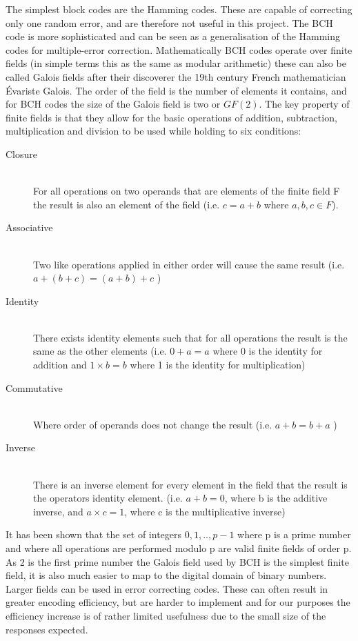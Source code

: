 The simplest block codes are the Hamming codes.
These are capable of correcting only one random error, and are therefore not
useful in this project.
The BCH code is more sophisticated and can be seen as a generalisation of the
Hamming codes for multiple-error correction.
Mathematically BCH codes operate over finite fields (in simple terms this as the
same as modular arithmetic) these can also be called Galois fields after their
discoverer the 19th century French mathematician \'{E}variste Galois.
The order of the field is the number of elements it contains, and for BCH codes
the size of the Galois field is two or $GF(2)$. The key property of finite
fields is that they allow for the basic operations of addition, subtraction,
multiplication and division to be used while holding to six conditions:

\begin{description}
\item[Closure] \hfill \\
For all operations on two operands that are elements of the finite field F the
result is also an element of the field (i.e.  $c=a+b$ where $a,b,c \in F$).
\item[Associative] \hfill \\
Two like operations applied in either order will cause the same result
(i.e.  $a+(b+c)=(a+b)+c$ )
\item[Identity] \hfill \\
There exists identity elements such that for all operations the result is the
same as the other elements (i.e. $0 + a = a$ where 0 is the identity for addition
and $1 \times b = b$ where 1 is the identity for multiplication)
\item[Commutative] \hfill \\
Where order of operands does not change the result (i.e. $a + b = b + a$ )
\item[Inverse] \hfill \\
There is an inverse element for every element in the field that the result is
the operators identity element. (i.e. $a + b = 0$, where b is the additive
inverse, and  $a \times c = 1$, where c is the multiplicative inverse)
\end{description}

It has been shown that the set of integers {$0, 1,..,p-1$} where p is a prime
number and where all operations are performed modulo p are valid finite fields
of order p.
As 2 is the first prime number the Galois field used by BCH is the simplest
finite field, it is also much easier to map to the digital domain of binary
numbers.
Larger fields can be used in error correcting codes. These can often result in
greater encoding efficiency, but are harder to implement and for our purposes
the efficiency increase is of rather limited usefulness due to the small size
of the responses expected.

